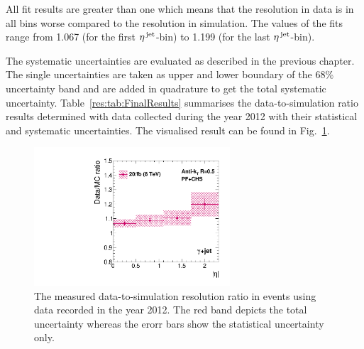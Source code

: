 All fit results are greater than one which means that the resolution in data is in all bins worse compared to the resolution in simulation.
The values of the fits range from 1.067 (for the first ${\eta}^{\text{\,jet}}$-bin) to 1.199 (for the last ${\eta}^{\text{\,jet}}$-bin). 

The systematic uncertainties are evaluated as described in the previous chapter. 
The single uncertainties are taken as upper and lower boundary of the 68\% uncertainty band and are added in quadrature to get the total systematic uncertainty.
Table~\ref{res:tab:FinalResults} summarises the data-to-simulation ratio results determined with data collected during the year 2012 with their statistical and systematic uncertainties.
The visualised result can be found in Fig.~\ref{res:fig:RatioFinal}.\\

\renewcommand{\arraystretch}{1.5}
\begin{table}[!t]
\centering
\caption{Data-to-simulation resolution scaling factors \rhores with statistical and systematic uncertainties.}
\label{res:tab:FinalResults}
\Large{
}
\end{table}  

\begin{figure}[!b]
 \centering
    \includegraphics[width=0.65\textwidth]{figures/resolution/results/MySingleFinalResult.pdf}
  \caption{The measured data-to-simulation resolution ratio in \GAMJET events using data recorded in the year 2012.
           The red band depicts the total uncertainty whereas the erorr bars show the statistical uncertainty only.}
  \label{res:fig:RatioFinal}
\end{figure}

